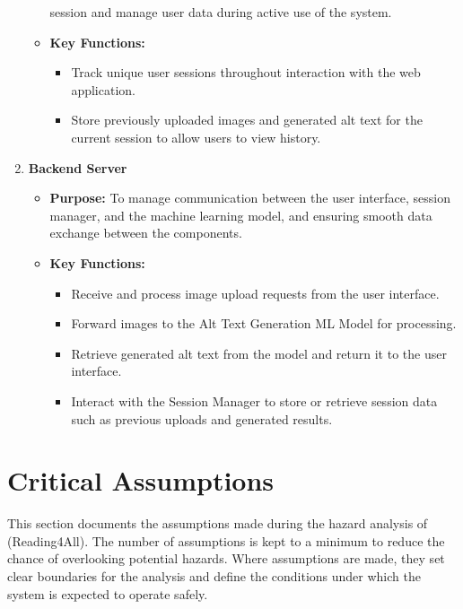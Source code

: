 \documentclass{article}
\begin{document}
\begin{enumerate}
\begin{itemize}
        session and manage user data during active use of the system.
      \item \textbf{Key Functions:}
        \begin{itemize}
          \item Track unique user sessions throughout interaction
            with the web application.
          \item Store previously uploaded images and generated
            alt text for the current session to allow users
            to view history.
        \end{itemize}
    \end{itemize}
    \item \textbf{Backend Server}
    \begin{itemize}
        \item \textbf{Purpose:} To manage communication between the user interface, session manager, and the machine learning model, and ensuring smooth data exchange between the components.
        \item \textbf{Key Functions:}
        \begin{itemize}
            \item Receive and process image upload requests from the user interface.
            \item Forward images to the Alt Text Generation ML Model for processing.
            \item Retrieve generated alt text from the model and return it to the user interface. 
            \item Interact with the Session Manager to store or retrieve session data such as previous uploads and generated results.
        \end{itemize}
    \end{itemize}
\end{enumerate}
\section{Critical Assumptions}
This section documents the assumptions made during the hazard analysis of
\progname{} (Reading4All). The number of assumptions is kept to a minimum
to reduce the chance of overlooking potential hazards. Where assumptions
are made, they set clear boundaries for the analysis and define the
conditions under which the system is expected to operate safely.
\end{document}
